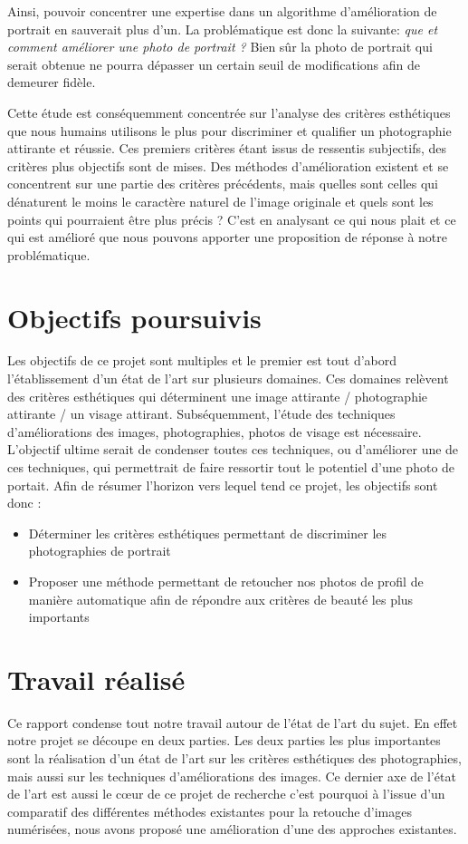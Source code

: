 \documentclass[11pt, french]{report-rd-info}
\begin{document}
Ainsi, pouvoir concentrer une expertise dans un algorithme d'amélioration de portrait en sauverait plus d'un. La problématique est donc la suivante: \emph{que et comment améliorer une photo de portrait ?} Bien sûr la photo de portrait qui serait obtenue ne pourra dépasser un certain seuil de modifications afin de demeurer fidèle.

Cette étude est conséquemment concentrée sur l'analyse des critères esthétiques que nous humains utilisons le plus pour discriminer et qualifier un photographie attirante et réussie. Ces premiers critères étant issus de ressentis subjectifs, des critères plus objectifs sont de mises. 
Des méthodes d'amélioration existent et se concentrent sur une partie des critères précédents, mais quelles sont celles qui dénaturent le moins le caractère naturel de l'image originale et quels sont les points qui pourraient être plus précis ? 
C'est en analysant ce qui nous plait et ce qui est amélioré que nous pouvons apporter une proposition de réponse à notre problématique.

\section{Objectifs poursuivis}
Les objectifs de ce projet sont multiples et le premier est tout d'abord l'établissement d'un état de l'art sur plusieurs domaines. Ces domaines relèvent des critères esthétiques qui déterminent une image attirante / photographie attirante / un visage attirant. Subséquemment, l'étude des techniques d'améliorations des images, photographies, photos de visage est nécessaire. L'objectif ultime serait de condenser toutes ces techniques, ou d'améliorer une de ces techniques, qui permettrait de faire ressortir tout le potentiel d'une photo de portait. Afin de résumer l'horizon vers lequel tend ce projet, les objectifs sont donc :
\begin{itemize}
\item Déterminer les critères esthétiques permettant de discriminer les photographies de portrait
\item Proposer une méthode permettant de retoucher nos photos de profil de manière automatique afin de répondre aux critères de beauté les plus importants 
\end{itemize}


\section{Travail réalisé}
Ce rapport condense tout notre travail autour de l'état de l'art du sujet. En effet notre projet se découpe en deux parties. Les deux parties les plus importantes sont la réalisation d'un état de l'art sur les critères esthétiques des photographies, mais aussi sur les techniques d'améliorations des images. Ce dernier axe de l'état de l'art est aussi le cœur de ce projet de recherche c'est pourquoi à l'issue d'un comparatif des différentes méthodes existantes pour la retouche d'images numérisées, nous avons proposé une amélioration d'une des approches existantes. 
\end{document}
